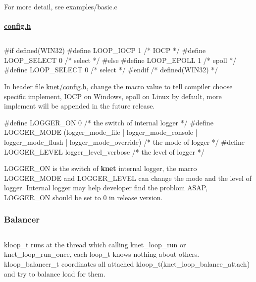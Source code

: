 For more detail, see {\ttfamily examples/basic.\+c}

\paragraph*{\hyperlink{a00053}{config.\+h}}

\subsection*{}

\begin{DoxyVerb}#if defined(WIN32)
    #define LOOP_IOCP 1    /* IOCP */
    #define LOOP_SELECT 0  /* select */
#else
    #define LOOP_EPOLL 1   /* epoll */
    #define LOOP_SELECT 0  /* select */
#endif /* defined(WIN32) */
\end{DoxyVerb}


In header file {\ttfamily \hyperlink{a00053}{knet/config.\+h}}, change the macro value to tell compiler choose specific implement, I\+O\+C\+P on Windows, epoll on Linux by default, more implement will be appended in the future release. \begin{DoxyVerb}#define LOGGER_ON 0 /* the switch of internal logger */
#define LOGGER_MODE (logger_mode_file | logger_mode_console | logger_mode_flush | logger_mode_override) /* the mode of logger */
#define LOGGER_LEVEL logger_level_verbose /* the level of logger */
\end{DoxyVerb}


{\ttfamily L\+O\+G\+G\+E\+R\+\_\+\+O\+N} is the switch of {\bfseries knet} internal logger, the macro {\ttfamily L\+O\+G\+G\+E\+R\+\_\+\+M\+O\+D\+E} and {\ttfamily L\+O\+G\+G\+E\+R\+\_\+\+L\+E\+V\+E\+L} can change the mode and the level of logger. Internal logger may help developer find the problom A\+S\+A\+P, {\ttfamily L\+O\+G\+G\+E\+R\+\_\+\+O\+N} should be set to 0 in release version.

\subsubsection*{Balancer}

\subsection*{}

{\ttfamily kloop\+\_\+t} runs at the thread which calling {\ttfamily knet\+\_\+loop\+\_\+run} or {\ttfamily knet\+\_\+loop\+\_\+run\+\_\+once}, each {\ttfamily loop\+\_\+t} knows nothing about others. {\ttfamily kloop\+\_\+balancer\+\_\+t} coordinates all attached {\ttfamily kloop\+\_\+t}({\ttfamily knet\+\_\+loop\+\_\+balance\+\_\+attach}) and try to balance load for them.

